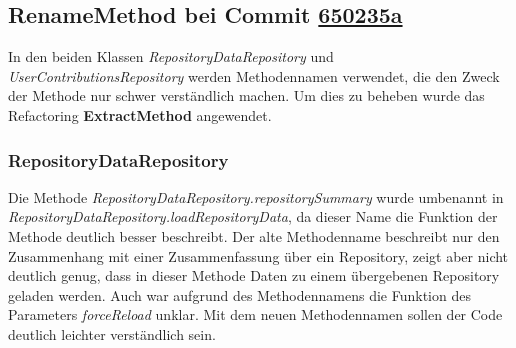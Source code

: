 \subsection{RenameMethod bei Commit \href{https://github.com/lukaspanni/OpenSourceStats/commit/650235a5868f35cd0c641f0112b921ddead17a17} {650235a}}
\label{sec:RenameMethod_Repositories}

In den beiden Klassen \textit{RepositoryDataRepository} und \textit{UserContributionsRepository} werden Methodennamen verwendet, die den Zweck der Methode nur schwer verständlich machen. Um dies zu beheben wurde das Refactoring \textbf{ExtractMethod} angewendet.
\subsubsection*{RepositoryDataRepository}
Die Methode \textit{RepositoryDataRepository.repositorySummary} wurde umbenannt in \textit{RepositoryDataRepository.loadRepositoryData}, da dieser Name die Funktion der Methode deutlich besser beschreibt. Der alte Methodenname beschreibt nur den Zusammenhang mit einer Zusammenfassung über ein Repository, zeigt aber nicht deutlich genug, dass in dieser Methode Daten zu einem übergebenen Repository geladen werden. Auch war aufgrund des Methodennamens die Funktion des Parameters \textit{forceReload} unklar.
Mit dem neuen Methodennamen sollen der Code deutlich leichter verständlich sein.
